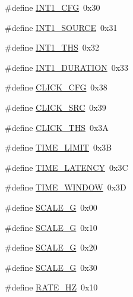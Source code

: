 \begin{DoxyCompactItemize}
\item 
\#define \hyperlink{group___definitions___a_d_s1299_gac4c771f61d79d83398f9a503ef4a3f88}{I\+N\+T1\+\_\+\+C\+F\+G}~0x30
\item 
\#define \hyperlink{group___definitions___a_d_s1299_gaa9927fc5df41765ee8122ed944ef0822}{I\+N\+T1\+\_\+\+S\+O\+U\+R\+C\+E}~0x31
\item 
\#define \hyperlink{group___definitions___a_d_s1299_ga6617aba37b5307e4a6c4231ec6f200da}{I\+N\+T1\+\_\+\+T\+H\+S}~0x32
\item 
\#define \hyperlink{group___definitions___a_d_s1299_ga4dfd8e11ec25b1b895d09f694fe4f938}{I\+N\+T1\+\_\+\+D\+U\+R\+A\+T\+I\+O\+N}~0x33
\item 
\#define \hyperlink{group___definitions___a_d_s1299_ga72296c7a2c62252b65b70c387f3de322}{C\+L\+I\+C\+K\+\_\+\+C\+F\+G}~0x38
\item 
\#define \hyperlink{group___definitions___a_d_s1299_ga709f34da66755c684de2b3d58de46515}{C\+L\+I\+C\+K\+\_\+\+S\+R\+C}~0x39
\item 
\#define \hyperlink{group___definitions___a_d_s1299_gaec7367f2c97c08cd2320937a7c4bcd44}{C\+L\+I\+C\+K\+\_\+\+T\+H\+S}~0x3\+A
\item 
\#define \hyperlink{group___definitions___a_d_s1299_gacb7e51d1df3047c08c50ae6682a6cd70}{T\+I\+M\+E\+\_\+\+L\+I\+M\+I\+T}~0x3\+B
\item 
\#define \hyperlink{group___definitions___a_d_s1299_gac30c996ced5888ea4564189fd45a1ce1}{T\+I\+M\+E\+\_\+\+L\+A\+T\+E\+N\+C\+Y}~0x3\+C
\item 
\#define \hyperlink{group___definitions___a_d_s1299_gabef5be0b55aff45fba055caae72d00ab}{T\+I\+M\+E\+\_\+\+W\+I\+N\+D\+O\+W}~0x3\+D
\item 
\#define \hyperlink{group___definitions___a_d_s1299_ga538f9ede8e121647077b12176339ac5c}{S\+C\+A\+L\+E\+\_\+G}~0x00
\item 
\#define \hyperlink{group___definitions___a_d_s1299_gae3f6336c2afcc6a107745c1679394538}{S\+C\+A\+L\+E\+\_\+G}~0x10
\item 
\#define \hyperlink{group___definitions___a_d_s1299_ga2647f28c119ef3da1c36c5b212a189b3}{S\+C\+A\+L\+E\+\_\+G}~0x20
\item 
\#define \hyperlink{group___definitions___a_d_s1299_ga1949c1a96f7f12cf22e52f79946b2f9d}{S\+C\+A\+L\+E\+\_\+G}~0x30
\item 
\#define \hyperlink{group___definitions___a_d_s1299_ga0b7f1f71f2f99d38b2ddf6607a8515c5}{R\+A\+T\+E\+\_\+H\+Z}~0x10
\item 

\end{DoxyCompactItemize}
